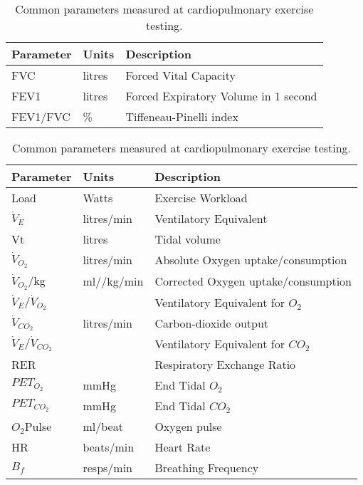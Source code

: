 \begin{table}[p]
	\centering
	\caption{Parameters measured at spirometry.}
	\label{table:spirometry}
	\renewcommand{\arraystretch}{1.5} %
	\setlength{\tabcolsep}{10pt} %
	\begin{tabular}{| m{2cm}  m{2cm}  m{7.7cm} |}
		\hline
		Parameter & Units  & Description                          \\ \hline
		FVC       & litres & Forced Vital Capacity                \\
		FEV1      & litres & Forced Expiratory Volume in 1 second \\
		FEV1/FVC  & \%     & Tiffeneau-Pinelli index              \\ \hline
	\end{tabular}
	
	\vspace{2cm}
	
	\caption{Common parameters measured at cardiopulmonary exercise testing.}
	\label{table:cpet_parameters}
	\begin{tabular}{| m{2cm}  m{2cm}  m{7.7cm} |}
		\hline
		Parameter                  & Units      & Description                         \\ \hline
		Load                       & Watts      & Exercise Workload                   \\
		$\dot{V}_E$                & litres/min & Ventilatory Equivalent              \\
		Vt                         & litres     & Tidal volume                        \\
		$\dot{V}_{O_2}$            & litres/min & Absolute Oxygen uptake/consumption  \\
		$\dot{V}_{O_2}$/kg         & ml//kg/min & Corrected Oxygen uptake/consumption \\
		$\dot{V}_E/\dot{V}_{O_2}$  &            & Ventilatory Equivalent for $O_2$    \\
		$\dot{V}_{CO_2}$           & litres/min & Carbon-dioxide output               \\
		$\dot{V}_E/\dot{V}_{CO_2}$ &            & Ventilatory Equivalent for $CO_2$   \\
		RER                        &            & Respiratory Exchange Ratio          \\
		$PET_{O_2}$                & mmHg       & End Tidal $O_2$                     \\
		$PET_{CO_2}$               & mmHg       & End Tidal $CO_2$                    \\
		${O_2}$Pulse               & ml/beat    & Oxygen pulse                        \\
		HR                         & beats/min  & Heart Rate                          \\
		$B_f$                      & resps/min  & Breathing Frequency                 \\ \hline
	\end{tabular}

\end{table}
